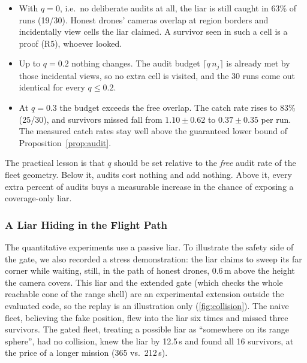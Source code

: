 \begin{findingbox}
\begin{itemize}
    \item With $q=0$, i.e.\ no deliberate audits at all, the liar is still caught in 63\% of runs (19/30). Honest
          drones' cameras overlap at region borders and incidentally view cells the liar claimed. A survivor seen in
          such a cell is a proof (R5), whoever looked.
    \item Up to $q=0.2$ nothing changes. The audit budget $\lceil q\,n_j\rceil$ is already met by those incidental
          views, so no extra cell is visited, and the 30 runs come out identical for every $q\le0.2$.
    \item At $q=0.3$ the budget exceeds the free overlap. The catch rate rises to 83\% (25/30), and survivors missed
          fall from $1.10\pm0.62$ to $0.37\pm0.35$ per run. The measured catch rates stay well above the guaranteed lower
          bound of Proposition~\ref{prop:audit}.
\end{itemize}
\end{findingbox}

The practical lesson is that $q$ should be set relative to the \emph{free} audit rate of the fleet geometry. Below it,
audits cost nothing and add nothing. Above it, every extra percent of audits buys a measurable increase in the chance
of exposing a coverage-only liar.

\subsubsection{A Liar Hiding in the Flight Path}
\label{sec:res-collision}

The quantitative experiments use a passive liar. To illustrate the safety side of the gate, we also recorded a stress
demonstration: the liar claims to sweep its far corner while waiting, still, in the path of honest drones, 0.6\,m above
the height the camera covers. This liar and the extended gate (which checks the whole reachable cone of the range shell)
are an experimental extension outside the evaluated code, so the replay is an illustration only
(\autoref{fig:collision}). The naive fleet, believing the fake position, flew into the liar six times and missed three
survivors. The gated fleet, treating a possible liar as ``somewhere on its range sphere'', had no collision, knew the
liar by 12.5\,s and found all 16 survivors, at the price of a longer mission (365 vs.\ 212\,s).

